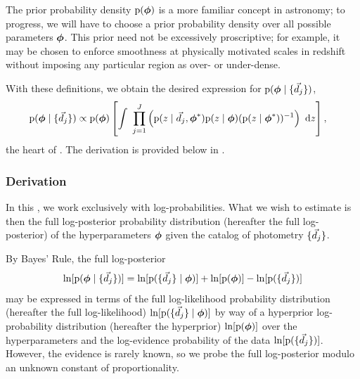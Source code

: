 The prior probability density $\mathrm{p}({\boldsymbol{\phi}})$ is a more familiar concept in astronomy; to progress, we will have to choose a prior probability density over all possible parameters ${\boldsymbol{\phi}}$.
This prior need not be excessively proscriptive; for example, it may be chosen to enforce smoothness at physically motivated scales in redshift without imposing any particular region as over- or under-dense.

With these definitions, we obtain the desired expression for $\mathrm{p}({\boldsymbol{\phi}} \mid \{\vec{d}_{j}\})$,
\begin{align}
\begin{split}
\eqlabel{eqn:fullpost}
\pr{\ndphi \gvn \{\data_{j}\}} & \propto \pr{\ndphi}\left[\integral{\prod_{j=1}^{J} \left(\pr{z \gvn \data_{j}, \ndphi^{*}}\pr{z \gvn \ndphi}(\pr{z \gvn \ndphi^{*}})^{-1}\right)}{z}\right] ,
\end{split}
\end{align}
the heart of \Chippr.
The derivation is provided below in .

\subsubsection{Derivation}


In this \paper, we work exclusively with log-probabilities.  
What we wish to estimate is then the full log-posterior probability distribution (hereafter the full log-posterior) of the hyperparameters ${\boldsymbol{\phi}}$ given the catalog of photometry $\{\vec{d}_{j}\}$.

By Bayes' Rule, the full log-posterior
\begin{equation}
\eqlabel{eq:basicbayes}
\ln[\pr{\ndphi \gvn \{\data_{j}\}}] = \ln[\pr{\{\data_{j}\} \gvn \ndphi}] + \ln[\pr{\ndphi}] - \ln[\pr{\{\data_{j}\}}]
\end{equation}
may be expressed in terms of the full log-likelihood probability distribution (hereafter the full log-likelihood) $\ln[\mathrm{p}(\{\vec{d}_{j}\} \mid {\ensuremath{\boldsymbol{\phi}}})]$ by way of a hyperprior log-probability distribution (hereafter the hyperprior) $\ln[\mathrm{p}({\boldsymbol{\phi}})]$ over the hyperparameters and the log-evidence probability of the data $\ln[\mathrm{p}(\{\vec{d}_{j}\})]$.
However, the evidence is rarely known, so we probe the full log-posterior modulo an unknown constant of proportionality.

